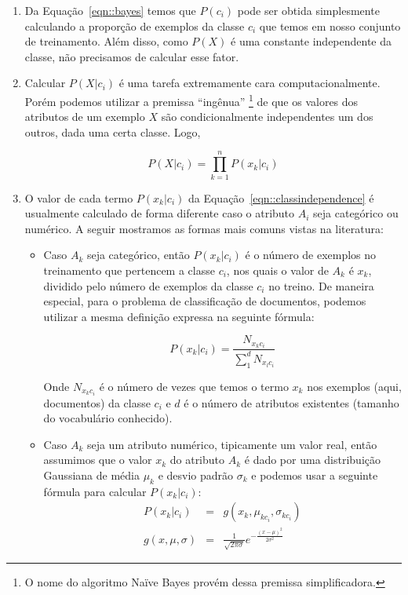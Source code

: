 \begin{enumerate}
    \item Da Equação~\ref{eqn::bayes} temos que $P(c_i)$ pode ser obtida simplesmente calculando a proporção de exemplos da classe $c_i$ que temos em nosso conjunto de treinamento. Além disso, como $P(X)$ é uma constante independente da classe, não precisamos de calcular esse fator.
       
    \item Calcular $P(X|c_i)$ é uma tarefa extremamente cara computacionalmente. Porém podemos utilizar a premissa ``ingênua'' \footnote{O nome do algoritmo Naïve Bayes provém dessa premissa simplificadora.} de que os valores dos atributos de um exemplo $X$ são condicionalmente independentes um dos outros, dada uma certa classe. Logo,

\begin{equation}\label{eqn::classindependence}
   P(X|c_{i}) = \prod^{n}_{k=1}{P(x_k|c_i) }
\end{equation}

\item O valor de cada termo $P(x_k|c_i)$ da Equação~\ref{eqn::classindependence} é usualmente calculado de forma diferente caso o atributo $A_i$ seja categórico ou numérico. A seguir mostramos as formas mais comuns vistas na literatura:
    \begin{itemize}

        \item Caso $A_k$ seja categórico, então $P(x_k|c_i)$ é o número de exemplos no treinamento que pertencem a classe $c_i$, nos quais o valor de $A_k$ é $x_k$, dividido pelo número de exemplos da classe $c_i$ no treino. De maneira especial, para o problema de classificação de documentos, podemos utilizar a mesma definição expressa na seguinte fórmula:

    \begin{equation}\label{eqn::nbcattexto}
        P(x_k|c_i) = \frac{ N_{x_{k}c_{i}} }{ \sum\limits^{d}_{1} { } N_{x_{l}c_{i}} } 
    \end{equation}

        Onde $N_{x_{k}c_{i}}$ é o número de vezes que temos o termo $x_k$ nos exemplos (aqui, documentos) da classe $c_i$ e $d$ é o número de atributos existentes (tamanho do vocabulário conhecido).

        \item Caso $A_k$ seja um atributo numérico, tipicamente um valor real, então assumimos que o valor $x_k$ do atributo $A_k$ é dado por uma distribuição Gaussiana de média $\mu_k$ e desvio padrão $\sigma_k$ e podemos usar a seguinte fórmula para calcular $P(x_k|c_i)$:
    \begin{eqnarray}\label{eqn::nbnumerico}
        P(x_k|c_i) & = & g(x_k, \mu_{kc_i}, \sigma_{kc_i})  \\
        g(x, \mu, \sigma) & = & \frac {1} { \sqrt{2\pi\sigma} } e^{ -\frac{(x-\mu)^2}{2\sigma^2}  } 
    \end{eqnarray}
        

\end{itemize}
\end{enumerate}
